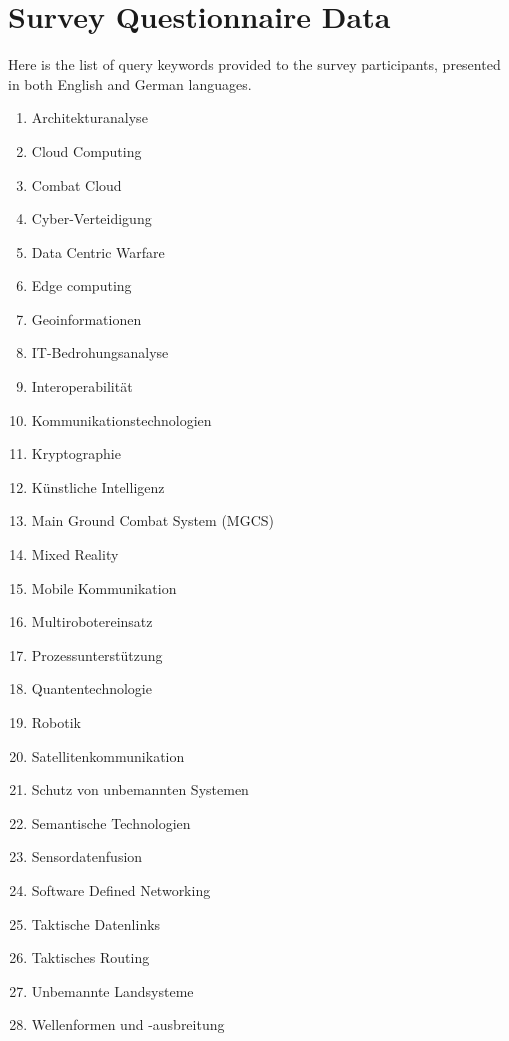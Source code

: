 \chapter{Survey Questionnaire Data}
\label{appendix:B}
Here is the list of query keywords provided to the survey participants, presented in both English and German languages.

\begin{enumerate}
	
	\item Architekturanalyse 
	 \item Cloud Computing
	 \item Combat Cloud
	 \item Cyber-Verteidigung
	 \item Data Centric Warfare
	 \item Edge computing
	 \item Geoinformationen
	 \item IT-Bedrohungsanalyse
	 \item Interoperabilität
	 \item Kommunikationstechnologien
	 \item Kryptographie
	 \item Künstliche Intelligenz
	 \item Main Ground Combat System (MGCS)
	 \item Mixed Reality
	 \item Mobile Kommunikation
	 \item Multirobotereinsatz
	 \item Prozessunterstützung
	 \item Quantentechnologie
	 \item Robotik
	 \item Satellitenkommunikation
	 \item Schutz von unbemannten Systemen
	 \item Semantische Technologien
	 \item Sensordatenfusion
	 \item Software Defined Networking
	 \item Taktische Datenlinks
	 \item Taktisches Routing
	 \item Unbemannte Landsysteme
	 \item Wellenformen und -ausbreitung
	
\end{enumerate}
